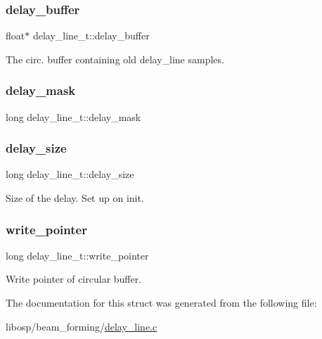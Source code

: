 \subsubsection{\texorpdfstring{delay\+\_\+buffer}{delay\_buffer}}
{\footnotesize\ttfamily float$\ast$ delay\+\_\+line\+\_\+t\+::delay\+\_\+buffer}



The circ. buffer containing old delay\+\_\+line samples. 

\mbox{\label{structdelay__line__t_adf31bf9bd65edf272a237fc3fe5da4a0}} 
\subsubsection{\texorpdfstring{delay\+\_\+mask}{delay\_mask}}
{\footnotesize\ttfamily long delay\+\_\+line\+\_\+t\+::delay\+\_\+mask}

\mbox{\label{structdelay__line__t_a37c6b3ad5d2d500817bf4bb3eb2f6f8d}} 
\subsubsection{\texorpdfstring{delay\+\_\+size}{delay\_size}}
{\footnotesize\ttfamily long delay\+\_\+line\+\_\+t\+::delay\+\_\+size}



Size of the delay. Set up on init. 

\mbox{\label{structdelay__line__t_a703f4e6cacaf50647c3b82ebe5c9c349}} 
\subsubsection{\texorpdfstring{write\+\_\+pointer}{write\_pointer}}
{\footnotesize\ttfamily long delay\+\_\+line\+\_\+t\+::write\+\_\+pointer}



Write pointer of circular buffer. 



The documentation for this struct was generated from the following file\+:\begin{DoxyCompactItemize}
\item 
libosp/beam\+\_\+forming/\mbox{\hyperlink{delay__line_8c}{delay\+\_\+line.\+c}}\end{DoxyCompactItemize}
